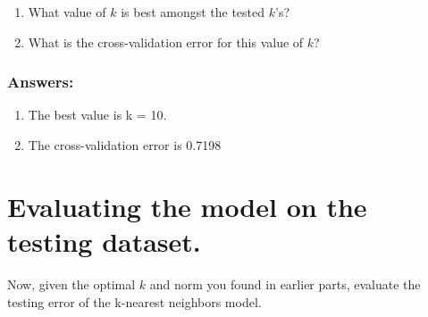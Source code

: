 \documentclass[11pt]{article}
\begin{document}
\begin{enumerate}
\def\labelenumi{(\arabic{enumi})}
\item
  What value of \(k\) is best amongst the tested \(k\)'s?
\item
  What is the cross-validation error for this value of \(k\)?
\end{enumerate}

    \hypertarget{answers}{%
\subsubsection{Answers:}\label{answers}}

    \begin{enumerate}
\def\labelenumi{(\arabic{enumi})}
\item
  The best value is k = 10.
\item
  The cross-validation error is 0.7198
\end{enumerate}

    \hypertarget{evaluating-the-model-on-the-testing-dataset.}{%
\section{Evaluating the model on the testing
dataset.}\label{evaluating-the-model-on-the-testing-dataset.}}

Now, given the optimal \(k\) and norm you found in earlier parts,
evaluate the testing error of the k-nearest neighbors model.
\end{document}
